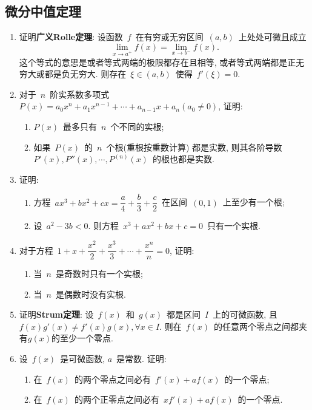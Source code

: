 \documentclass[UTF8,a4paper,20pt]{article}
\begin{document}
\subsection{微分中值定理}
\begin{enumerate}
\item 证明{\bf 广义Rolle定理}: 设函数~$f$~在有穷或无穷区间~$(a,b)$~上处处可微且成立
\[ \lim\limits_{x\to a^{+}}f(x)=\lim\limits_{x\to b^{-}}f(x).\]
这个等式的意思是或者等式两端的极限都存在且相等, 或者等式两端都是正无穷大或都是负无穷大. 则存在~$\xi\in(a,b)$~使得~$f'(\xi)=0$.

\item 对于~$n$~阶实系数多项式~$P(x)=a_0x^n+a_1x^{n-1}+\cdots+a_{n-1}x+a_n(a_0\neq 0)$, 证明: 
	\begin{enumerate}[(1)]
	\item $P(x)$~最多只有~$n$~个不同的实根;	
	\item 如果~$P(x)$~的~$n$~个根(重根按重数计算) 都是实数, 则其各阶导数~$P'(x), P''(x), \cdots, P^{(n)}(x)$~的根也都是实数.
	\end{enumerate}

\item 证明: 
	\begin{enumerate}[(1)]
	\item 方程~$ax^3+bx^2+cx=\dfrac{a}{4}+\dfrac{b}{3}+\dfrac{c}{2}$~在区间~$(0,1)$~上至少有一个根;
	\item 设~$a^2-3b<0$. 则方程~$x^3+ax^2+bx+c=0$~只有一个实根.
	\end{enumerate}

\item 对于方程~$1+x+\dfrac{x^2}{2}+\dfrac{x^3}{3}+\cdots+\dfrac{x^n}{n}=0$, 证明:
	\begin{enumerate}[(1)]
	\item 当~$n$~是奇数时只有一个实根;
	\item 当~$n$~是偶数时没有实根.
	\end{enumerate}

\item 证明{\bf Strum定理}: 设~$f(x)$~和~$g(x)$~都是区间~$I$~上的可微函数, 且~$f(x)g'(x)\neq f'(x)g(x), \forall x\in I$. 则在~$f(x)$~的任意两个零点之间都夹有$g(x)$的至少一个零点.

\item 设~$f(x)$~是可微函数, $a$~是常数. 证明: 
	\begin{enumerate}[(1)]
	\item 在~$f(x)$~的两个零点之间必有~$f'(x)+af(x)$~的一个零点;
	\item 在~$f(x)$~的两个正零点之间必有~$xf'(x)+af(x)$~的一个零点.
	\end{enumerate}


\end{enumerate}
\end{document}

